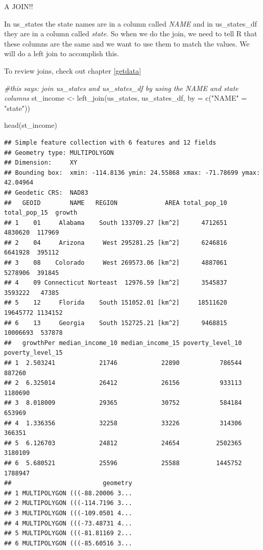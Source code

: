 \documentclass[
]{book}
\newenvironment{Shaded}{\begin{snugshade}}{\end{snugshade}}
\newcommand{\AttributeTok}[1]{\textcolor[rgb]{0.77,0.63,0.00}{#1}}
\newcommand{\CommentTok}[1]{\textcolor[rgb]{0.56,0.35,0.01}{\textit{#1}}}
\newcommand{\FunctionTok}[1]{\textcolor[rgb]{0.00,0.00,0.00}{#1}}
\newcommand{\NormalTok}[1]{#1}
\newcommand{\OtherTok}[1]{\textcolor[rgb]{0.56,0.35,0.01}{#1}}
\newcommand{\StringTok}[1]{\textcolor[rgb]{0.31,0.60,0.02}{#1}}
\begin{document}
A JOIN!!

In us\_states the state names are in a column called \emph{NAME} and in us\_states\_df they are in a column called \emph{state}. So when we do the join, we need to tell R that these columns are the same and we want to use them to match the values. We will do a left join to accomplish this.

To review joins, check out chapter \ref{getdata}

\begin{Shaded}
\begin{Highlighting}[]
\CommentTok{\#this says: join us\_states and us\_states\_df by using the NAME and state columns}
\NormalTok{st\_income }\OtherTok{\textless{}{-}} \FunctionTok{left\_join}\NormalTok{(us\_states, us\_states\_df, }\AttributeTok{by =} \FunctionTok{c}\NormalTok{(}\StringTok{"NAME"} \OtherTok{=} \StringTok{"state"}\NormalTok{))}

\FunctionTok{head}\NormalTok{(st\_income)}
\end{Highlighting}
\end{Shaded}

\begin{verbatim}
## Simple feature collection with 6 features and 12 fields
## Geometry type: MULTIPOLYGON
## Dimension:     XY
## Bounding box:  xmin: -114.8136 ymin: 24.55868 xmax: -71.78699 ymax: 42.04964
## Geodetic CRS:  NAD83
##   GEOID        NAME   REGION             AREA total_pop_10 total_pop_15  growth
## 1    01     Alabama    South 133709.27 [km^2]      4712651      4830620  117969
## 2    04     Arizona     West 295281.25 [km^2]      6246816      6641928  395112
## 3    08    Colorado     West 269573.06 [km^2]      4887061      5278906  391845
## 4    09 Connecticut Norteast  12976.59 [km^2]      3545837      3593222   47385
## 5    12     Florida    South 151052.01 [km^2]     18511620     19645772 1134152
## 6    13     Georgia    South 152725.21 [km^2]      9468815     10006693  537878
##   growthPer median_income_10 median_income_15 poverty_level_10 poverty_level_15
## 1  2.503241            21746            22890           786544           887260
## 2  6.325014            26412            26156           933113          1180690
## 3  8.018009            29365            30752           584184           653969
## 4  1.336356            32258            33226           314306           366351
## 5  6.126703            24812            24654          2502365          3180109
## 6  5.680521            25596            25588          1445752          1788947
##                         geometry
## 1 MULTIPOLYGON (((-88.20006 3...
## 2 MULTIPOLYGON (((-114.7196 3...
## 3 MULTIPOLYGON (((-109.0501 4...
## 4 MULTIPOLYGON (((-73.48731 4...
## 5 MULTIPOLYGON (((-81.81169 2...
## 6 MULTIPOLYGON (((-85.60516 3...
\end{verbatim}
\end{document}
